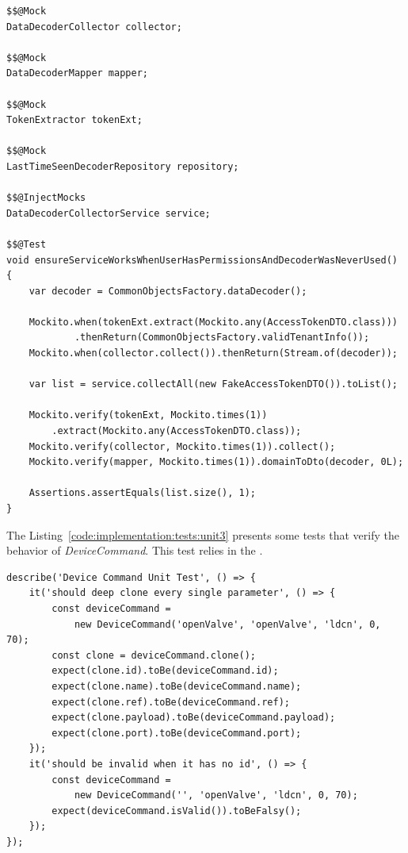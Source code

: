 \begin{lstlisting}[style=Java, caption=Unit Test - Data Decoder Backend Container, label={code:implementation:tests:unit2}]
$$@Mock
DataDecoderCollector collector;

$$@Mock
DataDecoderMapper mapper;

$$@Mock
TokenExtractor tokenExt;

$$@Mock
LastTimeSeenDecoderRepository repository;

$$@InjectMocks
DataDecoderCollectorService service;

$$@Test
void ensureServiceWorksWhenUserHasPermissionsAndDecoderWasNeverUsed() {
    var decoder = CommonObjectsFactory.dataDecoder();

    Mockito.when(tokenExt.extract(Mockito.any(AccessTokenDTO.class)))
            .thenReturn(CommonObjectsFactory.validTenantInfo());
    Mockito.when(collector.collect()).thenReturn(Stream.of(decoder));

    var list = service.collectAll(new FakeAccessTokenDTO()).toList();

    Mockito.verify(tokenExt, Mockito.times(1))
        .extract(Mockito.any(AccessTokenDTO.class));
    Mockito.verify(collector, Mockito.times(1)).collect();
    Mockito.verify(mapper, Mockito.times(1)).domainToDto(decoder, 0L);

    Assertions.assertEquals(list.size(), 1);
}
\end{lstlisting}

The Listing~\ref{code:implementation:tests:unit3} presents some tests that verify the behavior of \textit{DeviceCommand}. This test relies in the .

\begin{lstlisting}[style=javascript, caption=Unit Test - Device Management Frontend Model Library, label={code:implementation:tests:unit3}]
describe('Device Command Unit Test', () => {
    it('should deep clone every single parameter', () => {
        const deviceCommand =
            new DeviceCommand('openValve', 'openValve', 'ldcn', 0, 70);
        const clone = deviceCommand.clone();
        expect(clone.id).toBe(deviceCommand.id);
        expect(clone.name).toBe(deviceCommand.name);
        expect(clone.ref).toBe(deviceCommand.ref);
        expect(clone.payload).toBe(deviceCommand.payload);
        expect(clone.port).toBe(deviceCommand.port);
    });
    it('should be invalid when it has no id', () => {
        const deviceCommand =
            new DeviceCommand('', 'openValve', 'ldcn', 0, 70);
        expect(deviceCommand.isValid()).toBeFalsy();
    });
});
\end{lstlisting}

